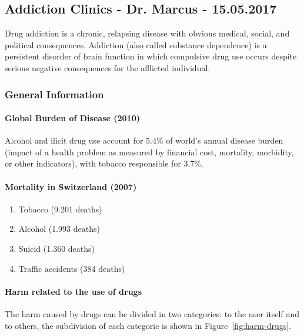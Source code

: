 \documentclass[12pt,article,oneside,a4paper]{memoir}
\begin{document}
\newpage
\subsection{Addiction Clinics - Dr. Marcus - 15.05.2017}

Drug addiction is a chronic, relapsing disease with obvious medical, social,
and political consequences. Addiction (also called substance dependence) is a
persistent disorder of brain function in which compulsive drug use occurs
despite serious negative consequences for the afflicted individual.

\subsubsection{General Information}
\paragraph{Global Burden of Disease (2010)}
Alcohol and ilicit drug use account for 5.4\% of world's annual disease burden
(impact of a health problem as measured by financial cost, mortality, morbidity,
or other indicators), with tobacco responsible for 3.7\%.

\paragraph{Mortality in Switzerland (2007)} 
\begin{enumerate}
\item Tobacco (9.201 deaths)
\item Alcohol (1.993 deaths)
\item Suicid (1.360 deaths)
\item Traffic accidents (384 deaths)
\end{enumerate}

\paragraph{Harm related to the use of drugs}
The harm caused by drugs can be divided in two categories: to the user itself
and to others, the subdivision of each categorie is shown in Figure~\ref{fig:harm-drugs}.
\end{document}
